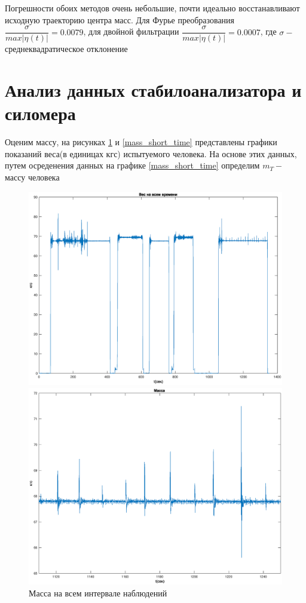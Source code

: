\documentclass[a4paper,12pt, openany]{book}
\theoremstyle{plain} %
\theoremstyle{definition} %
\theoremstyle{remark} %
\numberwithin{equation}{chapter}
\begin{document}
{Погрешности обоих методов очень небольшие, почти идеально восстанавливают исходную
траекторию центра масс. Для Фурье преобразования
$\dfrac{\sigma}{max|\eta(t)|}=0.0079$, для двойной фильтрации $\dfrac{\sigma}{max|\eta(t)|}=0.0007$, где $\sigma-$ среднеквадратическое отклонение

\section{Анализ данных стабилоанализатора и силомера}
Оценим массу, на рисунках \ref{mass_full_time} и
\ref{mass_short_time} представлены графики показаний веса(в единицах кгс) испытуемого человека.
 На основе этих данных, путем осреденения данных на графике \ref{mass_short_time} определим $m_T -$ массу человека 

\begin{figure}[h!]
    \begin{center}
        \begin{minipage}[h]{0.49\linewidth}
            \includegraphics[width=1\linewidth]{mass_full_time.eps}
            \caption{Масса на всем интервале наблюдений}
            \label{mass_full_time}
        \end{minipage}
        \hfill
        \begin{minipage}[h]{0.49\linewidth}
            \includegraphics[width=1\linewidth]{mass_concrete.eps}

\end{minipage}
\end{center}
\end{figure}}
\end{document}

